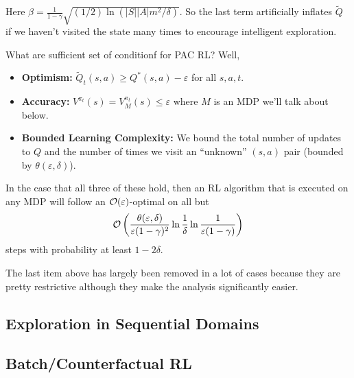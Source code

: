 \documentclass[12pt]{article}
\begin{document}
Here $\beta=\frac{1}{1-\gamma}\sqrt{(1/2)\ln(|S||A|m^2/\delta)}$. So the last term artificially inflates $\tilde Q$ if we haven't visited the state many times to encourage intelligent exploration.

What are sufficient set of conditionf for PAC RL? Well,
\begin{itemize}
	\item \textbf{Optimism:} $\tilde Q_t(s,a)\ge Q^\ast(s,a)-\varepsilon$ for all $s,a,t$.
	\item \textbf{Accuracy:} $V^{\pi_t}(s)=V_M^{\pi_t}(s)\le \varepsilon$ where $M$ is an MDP we'll talk about below.
	\item \textbf{Bounded Learning Complexity:} We bound the total number of updates to $Q$ and the number of times we visit an ``unknown'' $(s,a)$ pair (bounded by $\theta(\varepsilon,\delta)$).
\end{itemize}
In the case that all three of these hold, then an RL algorithm that is executed on any MDP will follow an $\mathcal{O}(\varepsilon)$-optimal on all but 
\[\mathcal{O}\left(\frac{\theta(\varepsilon,\delta)}{\varepsilon(1-\gamma)^2}\ln\frac{1}{\delta}\ln\frac{1}{\varepsilon(1-\gamma)}\right)\]
steps with probability at least $1-2\delta$.

The last item above has largely been removed in a lot of cases because they are pretty restrictive although they make the analysis significantly easier.


\subsection{Exploration in Sequential Domains}

\subsection{Batch/Counterfactual RL}
\end{document}
